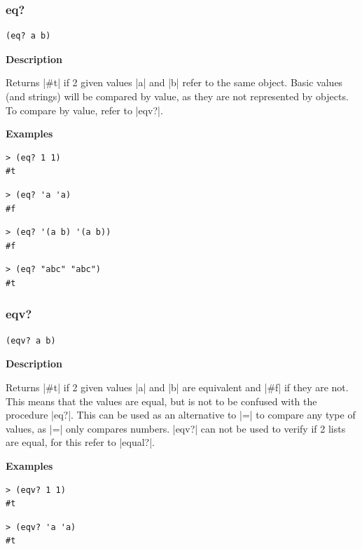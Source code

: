 \documentclass[a4paper]{article}
\begin{document}
\subsubsection{eq?}

\begin{lstlisting}[frame=none]
(eq? a b)
\end{lstlisting}

\textbf{Description}

Returns |#t| if 2 given values |a| and |b| refer to the same object. Basic values (and strings) will be compared by value, as they are not represented by objects. To compare by value, refer to |eqv?|.

\textbf{Examples}

\begin{lstlisting}
> (eq? 1 1)
#t
\end{lstlisting}

\begin{lstlisting}
> (eq? 'a 'a)
#f
\end{lstlisting}

\begin{lstlisting}
> (eq? '(a b) '(a b))
#f
\end{lstlisting}

\begin{lstlisting}
> (eq? "abc" "abc")
#t
\end{lstlisting}


\subsubsection{eqv?}

\begin{lstlisting}[frame=none]
(eqv? a b)
\end{lstlisting}

\textbf{Description}

Returns |#t| if 2 given values |a| and |b| are equivalent and |#f| if they are not. This means that the values are equal, but is not to be confused with the procedure |eq?|. This can be used as an alternative to |=| to compare any type of values, as |=| only compares numbers. |eqv?| can not be used to verify if 2 lists are equal, for this refer to |equal?|.

\textbf{Examples}

\begin{lstlisting}
> (eqv? 1 1)
#t
\end{lstlisting}

\begin{lstlisting}
> (eqv? 'a 'a)
#t
\end{lstlisting}
\end{document}

